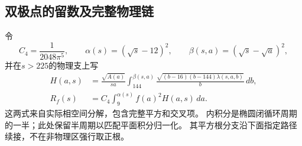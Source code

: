 \documentclass[11pt,a4paper]{ctexart}
\theoremstyle{cnplain}\newtheorem{theorem}{定理}[section]
\theoremstyle{definition}\newtheorem{definition}[theorem]{定义}
\theoremstyle{remark}\newtheorem{remark}[theorem]{注}
\begin{document}
\subsection{双极点的留数及完整物理链}
令
\[
 C_4=\frac1{2048\pi^5},\qquad
 \alpha(s)=(\sqrt s-12)^2,\qquad
 \beta(s,a)=(\sqrt s-\sqrt a)^2 ,
\]
并在$s>225$的物理支上写
\begin{align}
 H(a,s)&=\frac{\sqrt{A(a)}}{sa}
       \int_{144}^{\beta(s,a)}
       \frac{\sqrt{(b-16)(b-144)\lambda(s,a,b)}}{b}\,db,
       \label{eq:exchangeinner}\\
 R_f(s)&=C_4\int_9^{\alpha(s)} f(a)^2H(a,s)\,da.
       \label{eq:exchangeouter}
\end{align}
这两式来自实际相空间分解，包含完整平方和交叉项。
内积分是椭圆闭循环周期的一半；此处保留半周期以匹配平面积分归一化。
其平方根分支沿下面指定路径续接，不在非物理区强行取正根。
\end{document}
